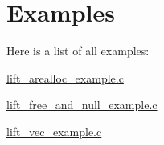 \section{Examples}
Here is a list of all examples\-:\begin{DoxyCompactItemize}
\item 
\hyperlink{lift_arealloc_example_8c-example}{lift\-\_\-arealloc\-\_\-example.\-c}
\item 
\hyperlink{lift_free_and_null_example_8c-example}{lift\-\_\-free\-\_\-and\-\_\-null\-\_\-example.\-c}
\item 
\hyperlink{lift_vec_example_8c-example}{lift\-\_\-vec\-\_\-example.\-c}
\end{DoxyCompactItemize}

